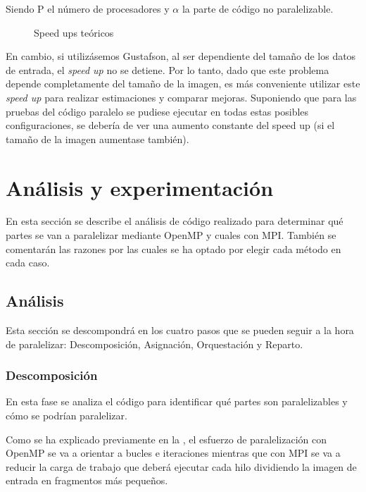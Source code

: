 \documentclass[12pt]{report} %
\begin{document}
Siendo P el número de procesadores y $\alpha$ la parte de código no paralelizable.

\begin{figure}[H]
    \makebox[\textwidth][c]{
        
    }
    \caption{Speed ups teóricos}
    \label{fig:ley_amdahl}
\end{figure}

En cambio, si utilizásemos Gustafson, al ser dependiente del tamaño de los datos de entrada, el
\textit{speed up} no se detiene. Por lo tanto, dado que este problema depende completamente del tamaño
de la imagen, es más conveniente utilizar este \textit{speed up} para realizar estimaciones y comparar
mejoras. Suponiendo que para las pruebas del código paralelo se pudiese ejecutar en todas estas posibles
configuraciones, se debería de ver una aumento constante del speed up (si el tamaño de la imagen aumentase
también).


\chapter{Análisis y experimentación}

En esta sección se describe el análisis de código realizado para determinar qué partes se van a
paralelizar mediante OpenMP y cuales con MPI. También se comentarán las razones por las cuales se ha optado
por elegir cada método en cada caso.

\section{Análisis}

Esta sección se descompondrá en los cuatro pasos que se pueden seguir a la hora de paralelizar:
Descomposición, Asignación, Orquestación y Reparto.

\subsection{Descomposición}

En esta fase se analiza el código para identificar qué partes son paralelizables y cómo se podrían paralelizar.

Como se ha explicado previamente en la , el esfuerzo de paralelización con OpenMP se va
a orientar a bucles e iteraciones mientras que con MPI se va a reducir la carga de trabajo que deberá ejecutar
cada hilo dividiendo la imagen de entrada en fragmentos más pequeños.
\end{document}
